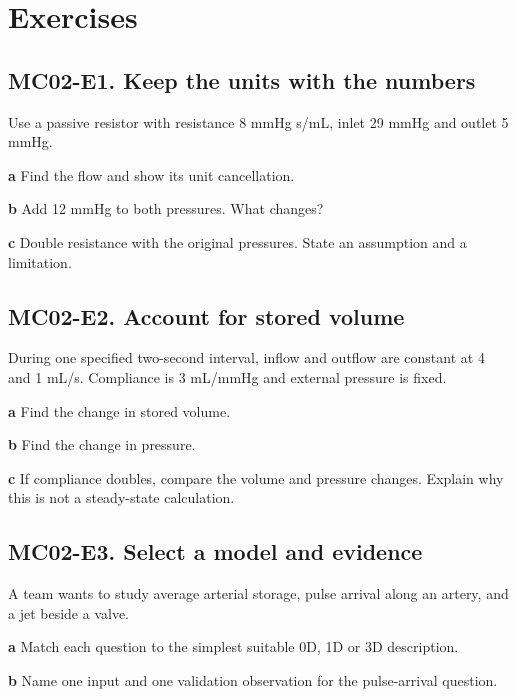 \documentclass[11pt,letterpaper]{article}
\theoremstyle{definition}\newtheorem{definition}{Definition}\newtheorem{example}{Example}
\numberwithin{equation}{section}
\begin{document}
\section*{Exercises}
\par\noindent\begin{minipage}{\linewidth}
\subsection*{MC02-E1. Keep the units with the numbers}
Use a passive resistor with resistance 8 mmHg s/mL, inlet 29 mmHg and outlet 5 mmHg.

\textbf{a} Find the flow and show its unit cancellation.

\end{minipage}\par\medskip
\textbf{b} Add 12 mmHg to both pressures. What changes?

\textbf{c} Double resistance with the original pressures. State an assumption and a limitation.

\par\noindent\begin{minipage}{\linewidth}
\subsection*{MC02-E2. Account for stored volume}
During one specified two-second interval, inflow and outflow are constant at 4 and 1 mL/s. Compliance is 3 mL/mmHg and external pressure is fixed.

\textbf{a} Find the change in stored volume.

\end{minipage}\par\medskip
\textbf{b} Find the change in pressure.

\textbf{c} If compliance doubles, compare the volume and pressure changes. Explain why this is not a steady-state calculation.

\par\noindent\begin{minipage}{\linewidth}
\subsection*{MC02-E3. Select a model and evidence}
A team wants to study average arterial storage, pulse arrival along an artery, and a jet beside a valve.

\textbf{a} Match each question to the simplest suitable 0D, 1D or 3D description.

\end{minipage}\par\medskip
\textbf{b} Name one input and one validation observation for the pulse-arrival question.
\end{document}
